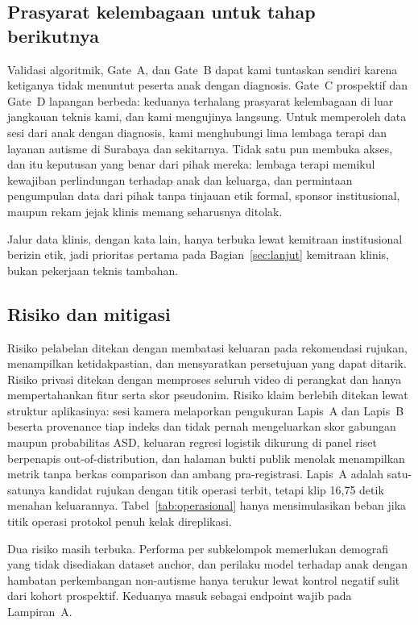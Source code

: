 \documentclass{article}
\begin{document}
\subsection{Prasyarat kelembagaan untuk tahap berikutnya}
\label{sec:kendala}

Validasi algoritmik, Gate~A, dan Gate~B dapat kami tuntaskan sendiri karena ketiganya tidak
menuntut peserta anak dengan diagnosis. Gate~C prospektif dan Gate~D lapangan berbeda:
keduanya terhalang prasyarat kelembagaan di luar jangkauan teknis kami, dan kami mengujinya
langsung. Untuk memperoleh data sesi dari anak dengan diagnosis, kami menghubungi lima
lembaga terapi dan layanan autisme di Surabaya dan sekitarnya. Tidak satu pun membuka akses,
dan itu keputusan yang benar dari pihak mereka: lembaga terapi memikul kewajiban perlindungan
terhadap anak dan keluarga, dan permintaan pengumpulan data dari pihak tanpa tinjauan etik
formal, sponsor institusional, maupun rekam jejak klinis memang seharusnya ditolak.

Jalur data klinis, dengan kata lain, hanya terbuka lewat kemitraan institusional berizin
etik, jadi prioritas pertama pada Bagian~\ref{sec:lanjut} kemitraan klinis, bukan pekerjaan
teknis tambahan.

\subsection{Risiko dan mitigasi}
\label{sec:risiko}

Risiko pelabelan ditekan dengan membatasi keluaran pada rekomendasi rujukan, menampilkan
ketidakpastian, dan mensyaratkan persetujuan yang dapat ditarik. Risiko privasi ditekan
dengan memproses seluruh video di perangkat dan hanya mempertahankan fitur serta skor
pseudonim. Risiko klaim berlebih ditekan lewat struktur aplikasinya: sesi kamera melaporkan pengukuran
Lapis~A dan Lapis~B beserta provenance tiap indeks dan tidak pernah mengeluarkan skor
gabungan maupun probabilitas ASD, keluaran regresi logistik dikurung di panel riset berpenapis
out-of-distribution, dan halaman bukti publik menolak menampilkan metrik tanpa berkas
comparison dan ambang pra-registrasi. Lapis~A adalah satu-satunya kandidat rujukan dengan
titik operasi terbit, tetapi klip 16,75 detik menahan keluarannya. Tabel~\ref{tab:operasional}
hanya mensimulasikan beban jika titik operasi protokol penuh kelak direplikasi.

Dua risiko masih terbuka. Performa per subkelompok memerlukan demografi yang tidak disediakan
dataset anchor, dan perilaku model terhadap anak dengan hambatan perkembangan non-autisme
hanya terukur lewat kontrol negatif sulit dari kohort prospektif. Keduanya masuk sebagai
endpoint wajib pada Lampiran~A.
\end{document}
